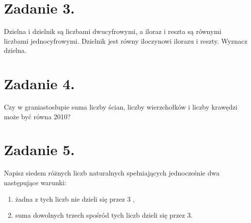 \documentclass[10pt]{article}
\begin{document}
\section*{Zadanie 3.}
Dzielna i dzielnik są liczbami dwucyfrowymi, a iloraz i reszta są równymi liczbami jednocyfrowymi. Dzielnik jest równy iloczynowi ilorazu i reszty. Wyznacz dzielna.

\section*{Zadanie 4.}
Czy w graniastosłupie suma liczby ścian, liczby wierzchołków i liczby krawędzi może być równa 2010?

\section*{Zadanie 5.}
Napisz siedem różnych liczb naturalnych spełniających jednocześnie dwa następujące warunki:

\begin{enumerate}
  \item żadna z tych liczb nie dzieli się przez 3 ,
  \item suma dowolnych trzech spośród tych liczb dzieli się przez 3.
\end{enumerate}
\end{document}
